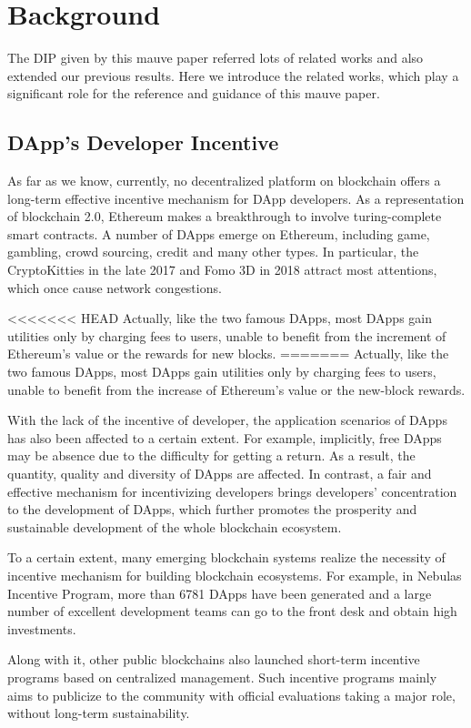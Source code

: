 \section{Background}
\label{sec:background}
The DIP given by this mauve paper referred  lots of related works and also extended our previous results. Here we introduce the related works, which play a significant role for the  reference and guidance of this mauve paper.

\subsection{DApp's Developer Incentive}
As far as we know, currently, no decentralized platform on blockchain offers a long-term effective incentive mechanism for DApp developers. As a representation of blockchain 2.0, Ethereum makes a breakthrough to involve turing-complete smart contracts. A number of DApps emerge on Ethereum, including game, gambling, crowd sourcing, credit and many other types. In particular, the CryptoKitties in the late 2017 and Fomo 3D in 2018 attract most attentions, which once cause network congestions.

<<<<<<< HEAD
Actually, like the two famous DApps, most DApps gain utilities only by charging fees to users, unable to benefit from the increment of Ethereum's value or the rewards for new blocks. 
=======
Actually, like the two famous DApps, most DApps gain utilities only by charging
fees to users, unable to benefit from the increase of Ethereum's value or the
new-block rewards.

With the lack of the incentive of developer, the application scenarios of DApps
has also been affected to a certain extent. For example, implicitly, free DApps
may be absence due to the difficulty for getting a return. As a result, the
quantity, quality and diversity of DApps are affected. In contrast, a fair and
effective mechanism for incentivizing developers brings developers'
concentration to the development of DApps, which further promotes the prosperity and sustainable development of the whole blockchain ecosystem.

To a certain extent, many emerging blockchain systems realize the necessity of incentive mechanism for building blockchain ecosystems. For example, in Nebulas Incentive Program, more than 6781 DApps have been generated and a large number of excellent development teams can go to the front desk and obtain high investments.

Along with it, other public blockchains also launched short-term incentive programs based on centralized management. Such incentive programs mainly aims to publicize to the community with official evaluations taking a major role, without long-term sustainability.


